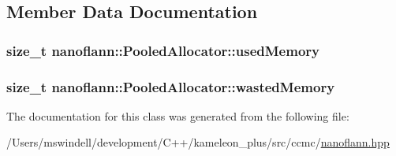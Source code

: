 \subsection{Member Data Documentation}
\hypertarget{classnanoflann_1_1_pooled_allocator_a4152d7a1d043d57aad464f11117d6e90}{
\subsubsection[{used\-Memory}]{\setlength{\rightskip}{0pt plus 5cm}size\-\_\-t nanoflann\-::\-Pooled\-Allocator\-::used\-Memory}}\label{classnanoflann_1_1_pooled_allocator_a4152d7a1d043d57aad464f11117d6e90}
\hypertarget{classnanoflann_1_1_pooled_allocator_aeb073342f83393f414888292d165738d}{
\subsubsection[{wasted\-Memory}]{\setlength{\rightskip}{0pt plus 5cm}size\-\_\-t nanoflann\-::\-Pooled\-Allocator\-::wasted\-Memory}}\label{classnanoflann_1_1_pooled_allocator_aeb073342f83393f414888292d165738d}


The documentation for this class was generated from the following file\-:\begin{DoxyCompactItemize}
\item 
/\-Users/mswindell/development/\-C++/kameleon\-\_\-plus/src/ccmc/\hyperlink{nanoflann_8hpp}{nanoflann.\-hpp}\end{DoxyCompactItemize}
